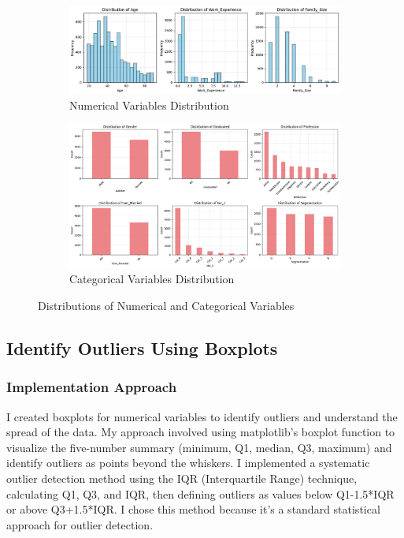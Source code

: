 \documentclass[12pt,a4paper]{article}
\begin{document}
\begin{figure}[h!]
\centering
\begin{subfigure}[b]{\textwidth}
    \centering
    \includegraphics[width=\textwidth]{Figures/numerical_distributions.png}
    \caption{Numerical Variables Distribution}
    \label{fig:numerical_dist}
\end{subfigure}
\hfill

\begin{subfigure}[b]{\textwidth}
    \centering
    \includegraphics[width=\textwidth]{Figures/categorical_distributions.png}
    \caption{Categorical Variables Distribution}
    \label{fig:categorical_dist}
\end{subfigure}
\caption{Distributions of Numerical and Categorical Variables}
\label{fig:variable_distributions}
\end{figure}

\subsection{Identify Outliers Using Boxplots}

\subsubsection{Implementation Approach}
I created boxplots for numerical variables to identify outliers and understand the spread of the data. My approach involved using matplotlib's boxplot function to visualize the five-number summary (minimum, Q1, median, Q3, maximum) and identify outliers as points beyond the whiskers. I implemented a systematic outlier detection method using the IQR (Interquartile Range) technique, calculating Q1, Q3, and IQR, then defining outliers as values below Q1-1.5*IQR or above Q3+1.5*IQR. I chose this method because it's a standard statistical approach for outlier detection. 
\end{document}
